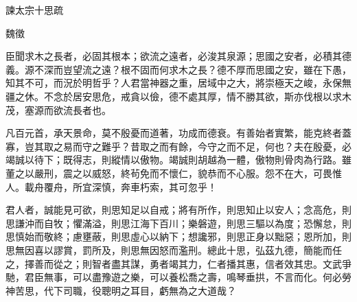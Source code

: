 諫太宗十思疏

魏徵

臣聞求木之長者，必固其根本；欲流之遠者，必浚其泉源；思國之安者，必積其德義。源不深而豈望流之遠？根不固而何求木之長？德不厚而思國之安，雖在下愚，知其不可，而況於明哲乎？人君當神器之重，居域中之大，將崇極天之峻，永保無疆之休。不念於居安思危，戒貪以儉，德不處其厚，情不勝其欲，斯亦伐根以求木茂，塞源而欲流長者也。

凡百元首，承天景命，莫不殷憂而道著，功成而德衰。有善始者實繁，能克終者蓋寡，豈其取之易而守之難乎？昔取之而有餘，今守之而不足，何也？夫在殷憂，必竭誠以待下；既得志，則縱情以傲物。竭誠則胡越為一體，傲物則骨肉為行路。雖董之以嚴刑，震之以威怒，終茍免而不懷仁，貌恭而不心服。怨不在大，可畏惟人。載舟覆舟，所宜深慎，奔車朽索，其可忽乎！

君人者，誠能見可欲，則思知足以自戒；將有所作，則思知止以安人；念高危，則思謙沖而自牧；懼滿溢，則思江海下百川；樂磐遊，則思三驅以為度；恐懈怠，則思慎始而敬終；慮壅蔽，則思虛心以納下；想讒邪，則思正身以黜惡；恩所加，則思無因喜以謬賞，罰所及，則思無因怒而濫刑。總此十思，弘茲九德，簡能而任之，擇善而從之；則智者盡其謀，勇者竭其力，仁者播其惠，信者效其忠。文武爭馳，君臣無事，可以盡豫遊之樂，可以養松喬之壽，鳴琴垂拱，不言而化。何必勞神苦思，代下司職，役聰明之耳目，虧無為之大道哉？

